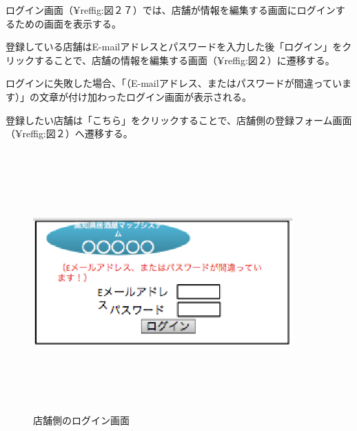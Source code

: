 \documentclass[a4j,titlepage]{jarticle}
\begin{document}
\clearpage
ログイン画面（¥ref{fig:図２７}）では、店舗が情報を編集する画面にログインするための画面を表示する。



登録している店舗はE-mailアドレスとパスワードを入力した後「ログイン」をクリックすることで、店舗の情報を編集する画面（¥ref{fig:図２}）に遷移する。



ログインに失敗した場合、「（E-mailアドレス、またはパスワードが間違っています）」の文章が付け加わったログイン画面が表示される。



登録したい店舗は「こちら」をクリックすることで、店舗側の登録フォーム画面（¥ref{fig:図２}）へ遷移する。



\begin {figure}[!htbp]
    \begin{center}
    \includegraphics [height=10cm, width=10cm]{27.eps}
    \caption {店舗側のログイン画面}
    \label {fig:27}
    \end{center}
\end {figure}
\end{document}
